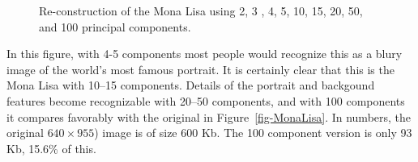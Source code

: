 \documentclass[
  letterpaper,
  10pt,
  krantz2]{krantz}
\begin{document}
\begin{figure}


\caption{\label{fig-mona-pca}Re-construction of the Mona Lisa using 2, 3
, 4, 5, 10, 15, 20, 50, and 100 principal components.}

\end{figure}%

In this figure, with 4-5 components most people would recognize this as
a blury image of the world's most famous portrait. It is certainly clear
that this is the Mona Lisa with 10--15 components. Details of the
portrait and backgound features become recognizable with 20--50
components, and with 100 components it compares favorably with the
original in Figure~\ref{fig-MonaLisa}. In numbers, the original
\(640 \times 955\)) image is of size 600 Kb. The 100 component version
is only 93 Kb, 15.6\% of this.
\end{document}
